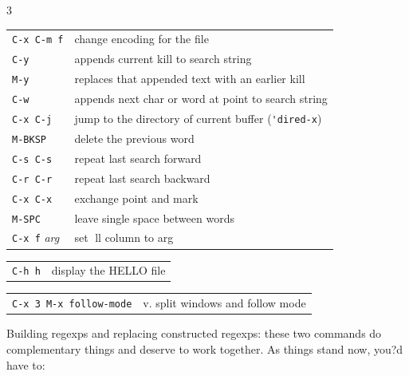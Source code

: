 \documentclass[11pt,landscape,a4paper]{article}
\begin{document}
\begin{multicols}{3}
\begin{tabular}{@{}ll@{}}
	{\verb|C-x C-m f|}		& change encoding for the file\\
	{\verb|C-y|} 					& appends current kill to search string \\ %
	{\verb|M-y|} 					& replaces that appended text with an earlier kill \\ %
	{\verb|C-w|} 					& appends next char or word at point to search string \\
	{\verb|C-x C-j|} 			& jump to the directory of current buffer (\verb!'dired-x!)\\ 
	{\verb|M-BKSP|} 			& delete the previous word\\
	{\verb|C-s C-s|} 			& repeat last search forward\\
	{\verb|C-r C-r|} 			& repeat last search backward\\
	{\verb|C-x C-x|} 			& exchange point and mark\\
	{\verb|M-SPC|}        & leave single space between words\\
	{\verb|C-x f| \emph{arg}}       & set ll column to arg\\
\end{tabular}

\vspace{1em}

\begin{tabular}{@{}ll@{}}
	{\verb|C-h h|}	 					& display the HELLO file\\ 
\end{tabular}

\vspace{1em}

\begin{tabular}{@{}ll@{}}
	{\verb|C-x 3 M-x follow-mode|}	 					& v. split windows and follow mode\\ 
\end{tabular}

\vspace*{1em}
\hline
\vspace*{1em}

Building regexps and replacing constructed regexps: these two commands do complementary things and deserve to work together. As things stand now, you?d have to:


\end{multicols}
\end{document}
